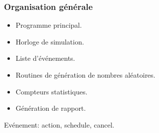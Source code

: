\documentclass[t,usepdftitle=false]{beamer}
\begin{document}
\begin{frame}
\frametitle{Organisation générale}

\begin{itemize}
\item
Programme principal.
\item
Horloge de simulation.
\item
Liste d'événements.
\item
Routines de génération de nombres aléatoires.
\item
Compteurs statistiques.
\item
Génération de rapport.
\end{itemize}

Evénement: action, schedule, cancel.

\end{frame}
\end{document}
